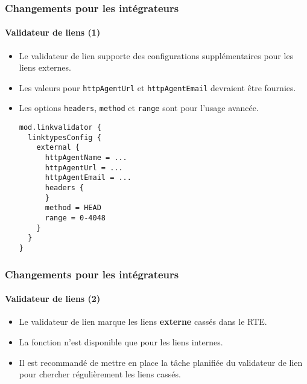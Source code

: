 
\begin{frame}[fragile]
	\frametitle{Changements pour les intégrateurs}
	\framesubtitle{Validateur de liens (1)}

	\lstset{basicstyle=\tiny\ttfamily}

	\begin{itemize}
		\item Le validateur de lien supporte des configurations supplémentaires pour les liens externes.
		\item Les valeurs pour \texttt{httpAgentUrl} et \texttt{httpAgentEmail} devraient être fournies.
		\item Les options \texttt{headers}, \texttt{method} et \texttt{range} sont pour l'usage avancée.
\begin{lstlisting}
mod.linkvalidator {
  linktypesConfig {
    external {
      httpAgentName = ...
      httpAgentUrl = ...
      httpAgentEmail = ...
      headers {
      }
      method = HEAD
      range = 0-4048
    }
  }
}
\end{lstlisting}

	\end{itemize}

\end{frame}


\begin{frame}[fragile]
	\frametitle{Changements pour les intégrateurs}
	\framesubtitle{Validateur de liens (2)}

	\begin{itemize}
		\item Le validateur de lien marque les liens \textbf{externe} cassés dans le RTE.
		\item La fonction n'est disponible que pour les liens internes.
		\item Il est recommandé de mettre en place la tâche planifiée du validateur de lien pour
			chercher régulièrement les liens cassés.
	\end{itemize}

\end{frame}


